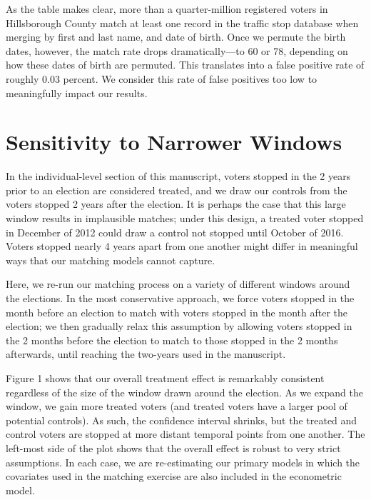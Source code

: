 \documentclass[
  12pt,
]{article}
\begin{document}
As the table makes clear, more than a quarter-million registered voters in Hillsborough County match at least one record in the traffic stop database when merging by first and last name, and date of birth. Once we permute the birth dates, however, the match rate drops dramatically---to 60 or 78, depending on how these dates of birth are permuted. This translates into a false positive rate of roughly 0.03 percent. We consider this rate of false positives too low to meaningfully impact our results.

\hypertarget{sensitivity-to-narrower-windows}{%
\section{Sensitivity to Narrower Windows}\label{sensitivity-to-narrower-windows}}

In the individual-level section of this manuscript, voters stopped in the 2 years prior to an election are considered treated, and we draw our controls from the voters stopped 2 years after the election. It is perhaps the case that this large window results in implausible matches; under this design, a treated voter stopped in December of 2012 could draw a control not stopped until October of 2016. Voters stopped nearly 4 years apart from one another might differ in meaningful ways that our matching models cannot capture.

Here, we re-run our matching process on a variety of different windows around the elections. In the most conservative approach, we force voters stopped in the month before an election to match with voters stopped in the month after the election; we then gradually relax this assumption by allowing voters stopped in the 2 months before the election to match to those stopped in the 2 months afterwards, until reaching the two-years used in the manuscript.

Figure 1 shows that our overall treatment effect is remarkably consistent regardless of the size of the window drawn around the election. As we expand the window, we gain more treated voters (and treated voters have a larger pool of potential controls). As such, the confidence interval shrinks, but the treated and control voters are stopped at more distant temporal points from one another. The left-most side of the plot shows that the overall effect is robust to very strict assumptions. In each case, we are re-estimating our primary models in which the covariates used in the matching exercise are also included in the econometric model.
\end{document}
